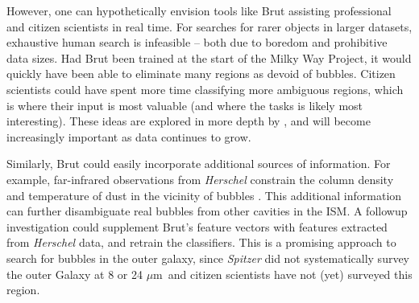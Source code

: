 \documentclass[preprint]{aastex}
\newcommand{\um}[0]{$\mu$m}
\begin{document}
However, one can hypothetically envision tools like Brut assisting professional and citizen scientists in real time. For searches for rarer objects in larger datasets, exhaustive human search is infeasible -- both due to boredom and prohibitive data sizes. Had Brut been trained at the start of the Milky Way Project, it would quickly have been able to eliminate many regions as devoid of bubbles. Citizen scientists could have spent more time classifying more ambiguous regions, which is where their input is most valuable (and where the tasks is likely most interesting). These ideas are explored in more depth by \cite{MSR}, and will become increasingly important as data continues to grow. 

Similarly, Brut could easily incorporate additional sources of information. For example, far-infrared observations from \emph{Herschel} constrain the column density and temperature of dust in the vicinity of bubbles \citep{Anderson12}. This additional information can further disambiguate real bubbles from other cavities in the ISM. A followup investigation could supplement Brut's feature vectors with features extracted from \emph{Herschel} data, and retrain the classifiers. This is a promising approach to search for bubbles in the outer galaxy, since \emph{Spitzer} did not systematically survey the outer Galaxy at 8 or 24 \um\, and citizen scientists have not (yet) surveyed this region.
\end{document}
